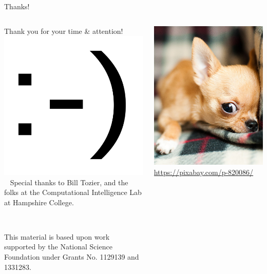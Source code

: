 \documentclass{beamer}
\begin{document}
\begin{frame}{Thanks!}
\begin{columns}
\begin{column}{0.6\textwidth}
	\center \Large
	Thank you for your time \& attention! \\ \medskip
	\includegraphics[width=.1\textwidth]{Illustrations/smile.png} \\ \medskip
	\normalsize
	~
	Special thanks to Bill Tozier, and the folks at the Computational Intelligence Lab at Hampshire College.
	
	~
	
	This material is based upon work supported by the National Science Foundation under 
	Grants No. 1129139 and 1331283.
\end{column}

\begin{column}{0.4\textwidth}
		\begin{center}
			\includegraphics[height=0.7\textheight]{Illustrations/chihuahua-smaller} \\
			\tiny \url{https://pixabay.com/p-820086/}
		\end{center} 
	\end{column}
\end{columns}

\end{frame}
\end{document}
